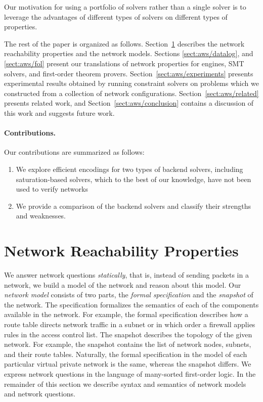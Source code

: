 Our motivation for using a portfolio of solvers rather than a single solver is to leverage the advantages of different types of solvers on different types of properties.

The rest of the paper is organized as follows. Section~\ref{sect:aws/specification} describes the network reachability properties and the network models. Sections \ref{sect:aws/datalog}, and \ref{sect:aws/fol} present our translations of network properties for \Datalog engines, SMT solvers, and first-order theorem provers. Section~\ref{sect:aws/experiments} presents experimental results obtained by running constraint solvers on problems which we constructed from a collection of network configurations. Section~\ref{sect:aws/related} presents related work, and Section~\ref{sect:aws/conclusion} contains a discussion of this work and suggests future work.

\paragraph{Contributions.} Our contributions are summarized as follows: \begin{enumerate}
\item We explore efficient encodings for two types of backend solvers, including 
saturation-based solvers, which to the best of our knowledge, have not been used to verify networks
\item We provide a comparison of the backend solvers and classify their strengths and weaknesses.
\end{enumerate}

\section{Network Reachability Properties}
\label{sect:aws/specification}
We answer network questions \emph{statically}, that is, instead of sending packets in a network, we build a model of the network and reason about this model. Our \emph{network model} consists of two parts, the \emph{formal specification} and the \emph{snapshot} of the network. The specification formalizes the semantics of each of the components available in the network. For example, the formal specification describes how a route table directs network traffic in a subnet or in which order a firewall applies rules in the access control list. The snapshot describes the topology of the given network. For example, the snapshot contains the list of network nodes, subnets, and their route tables. Naturally, the formal specification in the model of each particular virtual private network is the same, whereas the snapshot differs. We express network questions in the language of many-sorted first-order logic. In the remainder of this section we describe syntax and semantics of network models and network questions.

